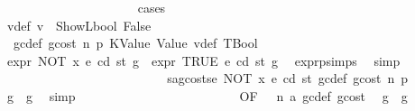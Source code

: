 \begin{isabellebody}
\ \ \ \ \ \ \ \ \ \ \ \ \ \ \ \ \ \ \ \ \isamarkupfalse%
\ {\isacharparenleft}{\kern0pt}cases{\isacharparenright}{\kern0pt}\isanewline
\ \ \ \ \ \ \ \ \ \ \ \ \ \ \ \ \ \ \ \ \ \ \isamarkupfalse%
\ v{\isacharunderscore}{\kern0pt}def{}{\isacharcolon}{\kern0pt}\ {\isachardoublequoteopen}v\ {\isacharequal}{\kern0pt}\ ShowL\isactrlsub b\isactrlsub o\isactrlsub o\isactrlsub l\ False{\isachardoublequoteclose}\isanewline
\ \ \ \ \ \ \ \ \ \ \ \ \ \ \ \ \ \ \ \ \ \ \isamarkupfalse%
\ {}{}{\isacharparenleft}{\kern0pt}{}{\isacharparenright}{\kern0pt}\ gc{\isacharunderscore}{\kern0pt}def\ gcost\ n\ p{}\ KValue\ Value\ v{\isacharunderscore}{\kern0pt}def\ TBool\ \isamarkupfalse%
\ {\isachardoublequoteopen}expr\ {\isacharparenleft}{\kern0pt}NOT\ x{\isacharparenright}{\kern0pt}\ e\ cd\ st\ g\ {\isacharequal}{\kern0pt}\ expr\ TRUE\ e\ cd\ st\ g{\isacharprime}{\kern0pt}{\isachardoublequoteclose}\ \isamarkupfalse%
\ expr{\isachardot}{\kern0pt}psimps{\isacharparenleft}{\kern0pt}{}{}{\isacharparenright}{\kern0pt}\ \isamarkupfalse%
\ simp\isanewline
\ \ \ \ \ \ \ \ \ \ \ \ \ \ \ \ \ \ \ \ \ \ \isamarkupfalse%
\ \isamarkupfalse%
\ {}{}{\isacharparenleft}{\kern0pt}{}{\isacharparenright}{\kern0pt}{\isacharbrackleft}{\kern0pt}\ {\isacharquery}{\kern0pt}s{\isacharprime}{\kern0pt}a{\isacharequal}{\kern0pt}{\isachardoublequoteopen}g{\isacharminus}{\kern0pt}costs\isactrlsub e\ {\isacharparenleft}{\kern0pt}NOT\ x{\isacharparenright}{\kern0pt}\ e\ cd\ st{\isachardoublequoteclose}{\isacharbrackright}{\kern0pt}\ gc{\isacharunderscore}{\kern0pt}def\ gcost\ n\ p{}\ \isamarkupfalse%
\ {\isachardoublequoteopen}g{\isacharprime}{\kern0pt}\ {\isasymle}\ g{\isachardoublequoteclose}\ \isamarkupfalse%
\ simp\isanewline
\ \ \ \ \ \ \ \ \ \ \ \ \ \ \ \ \ \ \ \ \ \ \isamarkupfalse%
\ \isamarkupfalse%
\ {}{}{\isacharparenleft}{\kern0pt}{}{\isacharparenright}{\kern0pt}{\isacharbrackleft}{\kern0pt}OF\ {\isacharunderscore}{\kern0pt}\ {\isacharunderscore}{\kern0pt}\ n{\isacharbrackright}{\kern0pt}\ a{}\ gc{\isacharunderscore}{\kern0pt}def\ gcost\ \isamarkupfalse%
\ {\isachardoublequoteopen}g{}{\isacharprime}{\kern0pt}\ {\isasymle}\ g{\isacharprime}{\kern0pt}{\isachardoublequoteclose}\ \isamarkupfalse%

\end{isabellebody}
